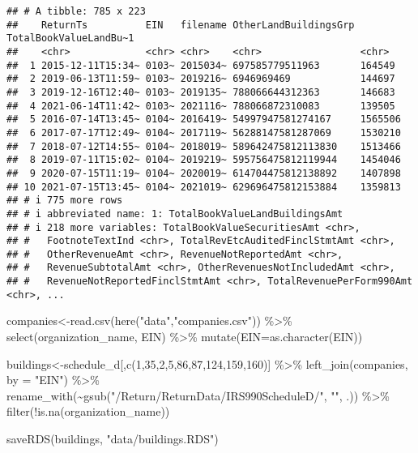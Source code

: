 \documentclass[
]{article}
\newenvironment{Shaded}{\begin{snugshade}}{\end{snugshade}}
\newcommand{\AttributeTok}[1]{\textcolor[rgb]{0.77,0.63,0.00}{#1}}
\newcommand{\DecValTok}[1]{\textcolor[rgb]{0.00,0.00,0.81}{#1}}
\newcommand{\FunctionTok}[1]{\textcolor[rgb]{0.00,0.00,0.00}{#1}}
\newcommand{\NormalTok}[1]{#1}
\newcommand{\OtherTok}[1]{\textcolor[rgb]{0.56,0.35,0.01}{#1}}
\newcommand{\SpecialCharTok}[1]{\textcolor[rgb]{0.00,0.00,0.00}{#1}}
\newcommand{\StringTok}[1]{\textcolor[rgb]{0.31,0.60,0.02}{#1}}
\begin{document}
\begin{verbatim}
## # A tibble: 785 x 223
##    ReturnTs          EIN   filename OtherLandBuildingsGrp TotalBookValueLandBu~1
##    <chr>             <chr> <chr>    <chr>                 <chr>                 
##  1 2015-12-11T15:34~ 0103~ 2015034~ 697585779511963       164549                
##  2 2019-06-13T11:59~ 0103~ 2019216~ 6946969469            144697                
##  3 2019-12-16T12:40~ 0103~ 2019135~ 788066644312363       146683                
##  4 2021-06-14T11:42~ 0103~ 2021116~ 788066872310083       139505                
##  5 2016-07-14T13:45~ 0104~ 2016419~ 54997947581274167     1565506               
##  6 2017-07-17T12:49~ 0104~ 2017119~ 56288147581287069     1530210               
##  7 2018-07-12T14:55~ 0104~ 2018019~ 589642475812113830    1513466               
##  8 2019-07-11T15:02~ 0104~ 2019219~ 595756475812119944    1454046               
##  9 2020-07-15T11:19~ 0104~ 2020019~ 614704475812138892    1407898               
## 10 2021-07-15T13:45~ 0104~ 2021019~ 629696475812153884    1359813               
## # i 775 more rows
## # i abbreviated name: 1: TotalBookValueLandBuildingsAmt
## # i 218 more variables: TotalBookValueSecuritiesAmt <chr>,
## #   FootnoteTextInd <chr>, TotalRevEtcAuditedFinclStmtAmt <chr>,
## #   OtherRevenueAmt <chr>, RevenueNotReportedAmt <chr>,
## #   RevenueSubtotalAmt <chr>, OtherRevenuesNotIncludedAmt <chr>,
## #   RevenueNotReportedFinclStmtAmt <chr>, TotalRevenuePerForm990Amt <chr>, ...
\end{verbatim}

\begin{Shaded}
\begin{Highlighting}[]
\NormalTok{companies}\OtherTok{\textless{}{-}}\FunctionTok{read.csv}\NormalTok{(}\FunctionTok{here}\NormalTok{(}\StringTok{"data"}\NormalTok{,}\StringTok{"companies.csv"}\NormalTok{)) }\SpecialCharTok{\%\textgreater{}\%} \FunctionTok{select}\NormalTok{(organization\_name, EIN) }\SpecialCharTok{\%\textgreater{}\%} \FunctionTok{mutate}\NormalTok{(}\AttributeTok{EIN=}\FunctionTok{as.character}\NormalTok{(EIN))}

\NormalTok{buildings}\OtherTok{\textless{}{-}}\NormalTok{schedule\_d[,}\FunctionTok{c}\NormalTok{(}\DecValTok{1}\NormalTok{,}\DecValTok{35}\NormalTok{,}\DecValTok{2}\NormalTok{,}\DecValTok{5}\NormalTok{,}\DecValTok{86}\NormalTok{,}\DecValTok{87}\NormalTok{,}\DecValTok{124}\NormalTok{,}\DecValTok{159}\NormalTok{,}\DecValTok{160}\NormalTok{)] }\SpecialCharTok{\%\textgreater{}\%} 
  \FunctionTok{left\_join}\NormalTok{(companies, }\AttributeTok{by =} \StringTok{"EIN"}\NormalTok{) }\SpecialCharTok{\%\textgreater{}\%} 
  \FunctionTok{rename\_with}\NormalTok{(}\SpecialCharTok{\textasciitilde{}}\FunctionTok{gsub}\NormalTok{(}\StringTok{"/Return/ReturnData/IRS990ScheduleD/"}\NormalTok{, }\StringTok{""}\NormalTok{, .)) }\SpecialCharTok{\%\textgreater{}\%} 
  \FunctionTok{filter}\NormalTok{(}\SpecialCharTok{!}\FunctionTok{is.na}\NormalTok{(organization\_name))}

\FunctionTok{saveRDS}\NormalTok{(buildings, }\StringTok{"data/buildings.RDS"}\NormalTok{)}
\end{Highlighting}
\end{Shaded}
\end{document}
